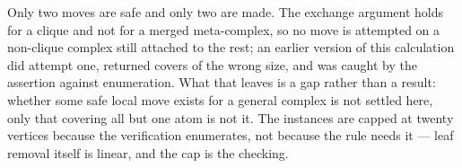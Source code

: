 Only two moves are safe and only two are made. The exchange argument holds for a
clique and not for a merged meta-complex, so no move is attempted on a
non-clique complex still attached to the rest; an earlier version of this
calculation did attempt one, returned covers of the wrong size, and was caught
by the assertion against enumeration. What that leaves is a gap rather than a
result: whether some safe local move exists for a general complex is not
settled here, only that covering all but one atom is not it. The instances are
capped at twenty vertices because the verification enumerates, not because the
rule needs it --- leaf removal itself is linear, and the cap is the checking.


